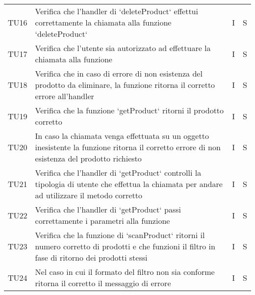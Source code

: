 \begin{center}
\begin{longtable}[!h]{p{45px} p{255px} p{35px} p{35px}}
        TU16          & Verifica che l'handler di `deleteProduct` effettui correttamente la chiamata alla funzione `deleteProduct`                                                                                       & I              & S              \\
        TU17          & Verifica che l'utente sia autorizzato ad effettuare la chiamata alla funzione                                                                                                                    & I              & S              \\
        TU18          & Verifica che in caso di errore di non esistenza del prodotto da eliminare, la funzione ritorna il corretto errore all'handler                                                                    & I              & S              \\
        TU19          & Verifica che la funzione `getProduct` ritorni il prodotto corretto                                                                                                                               & I              & S              \\
        TU20          & In caso la chiamata venga effettuata su un oggetto inesistente la funzione ritorna il corretto errore di non esistenza del prodotto richiesto                                                    & I              & S              \\
        TU21          & Verifica che l'handler di `getProduct` controlli la tipologia di utente che effettua la chiamata per andare ad utilizzare il metodo corretto                                                     & I              & S              \\
        TU22          & Verifica che l'handler di `getProduct` passi correttamente i parametri alla funzione                                                                                                             & I              & S              \\
        TU23          & Verifica che la funzione di `scanProduct` ritorni il numero corretto di prodotti e che funzioni il filtro in fase di ritorno dei prodotti stessi                                                 & I              & S              \\
        TU24          & Nel caso in cui il formato del filtro non sia conforme ritorna il corretto il messaggio di errore                                                                                                & I              & S              \\

\end{longtable}
\end{center}
